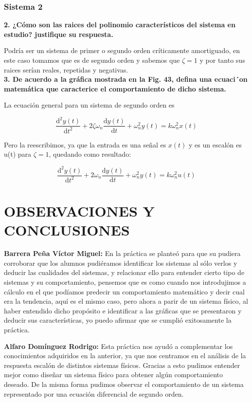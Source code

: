 \subsubsection{Sistema 2}

\textbf{2. ¿Cómo son las raices del polinomio característicos del sistema en estudio? justifique su respuesta.}

Podría ser un sistema de primer o segundo orden críticamente amortiguado, en este caso tomamos que es de segundo orden y sabemos que   $\zeta= 1$ y por tanto sus raices serían reales, repetidas y negativas.\\


\textbf{3. De acuerdo a la gráfica mostrada en la Fig. 43, defina una ecuaci´on matemática que caracterice el comportamiento de dicho sistema.}

La ecuación general para un sistema de segundo orden es

$$
\frac{\mathrm{d}^{2} y(t)}{\mathrm{d} t^{2}}+2 \zeta \omega_{n} \frac{\mathrm{d} y(t)}{\mathrm{d} t}+\omega_{n}^{2} y(t)=k \omega_{n}^{2} x(t)
$$

Pero la reescribimos, ya que la entrada es una señal es $x(t)$ y es un escalón es u(t) para $\zeta=1$, quedando como resultado:

$$
\frac{\mathrm{d}^{2} y(t)}{\mathrm{d} t^{2}}+2 \omega_{n} \frac{\mathrm{d} y(t)}{\mathrm{d} t}+\omega_{n}^{2} y(t)=k \omega_{n}^{2} u(t)
$$

\section{OBSERVACIONES Y CONCLUSIONES}
\textbf{ Barrera Peña Víctor Miguel:} En la práctica se planteó para que su pudiera corroborar que los alumnos pudiéramos identificar los sistemas al sólo verlos y deducir las cualidades del sistemas, y relacionar ello para entender cierto tipo de sistemas y su comportamiento, pensemos que es como cuando nos introdujimos a cálculo en el que podíamos predecir un comportamiento matemático y decir cual era la tendencia, aquí es el mismo caso, pero ahora a parir de un sistema físico, al haber entendido dicho propósito e identificar a las gráficas que se presentaron y deducir sus características, yo puedo afirmar que se cumplió exitosamente la práctica.

\textbf{Alfaro Domínguez Rodrigo:} Esta práctica nos ayudó a complementar los conocimientos adquiridos en la anterior, ya que nos centramos en el análisis de la respuesta escalón de distintos sistemas físicos. Gracias a esto pudimos entender mejor como diseñar un sistema físico para obtener algún comportamiento deseado. De la misma forma pudimos observar el comportamiento de un sistema representado por una ecuación diferencial de segundo orden.\\

